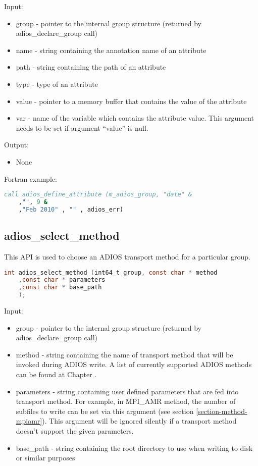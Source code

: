 Input:
\begin{itemize}
\item group - pointer to the internal group structure (returned by adios\_declare\_group 
call)

\item name - string containing the annotation name of an attribute

\item path - string containing the path of an attribute

\item type  - type of an attribute

\item value - pointer to a memory buffer that contains the value of the attribute

\item var - name of the variable which contains the attribute value. This argument needs 
to be set if argument ``value'' is null.  
\end{itemize}

Output:
\begin{itemize}
\item None
\end{itemize}

Fortran example: 
\begin{lstlisting}[language=Fortran,caption={},label={}]
call adios_define_attribute (m_adios_group, "date" &
	,"", 9 &
	,"Feb 2010" , "" , adios_err)
\end{lstlisting}

\subsection{adios\_select\_method}
This API is used to choose an ADIOS transport method for a particular group. 

\begin{lstlisting}[language=C,caption={},label={}]
int adios_select_method (int64_t group, const char * method
	,const char * parameters 
	,const char * base_path
	);
\end{lstlisting}

Input:
\begin{itemize}
\item group - pointer to the internal group structure (returned by adios\_declare\_group 
call)

\item method - string containing the name of transport method that will be invoked during 
ADIOS write. A list of currently supported ADIOS methods can be found at Chapter 
.

\item parameters - string containing user defined parameters that are fed into transport 
method.  For example, in MPI\_AMR method, the number of subfiles to write can be 
set via this argument (see section \ref{section-method-mpiamr}).  This argument will be ignored silently 
if a transport method doesn't support the given parameters.

\item base\_path -  string containing the root directory to use when writing to disk 
or similar purposes
\end{itemize}

